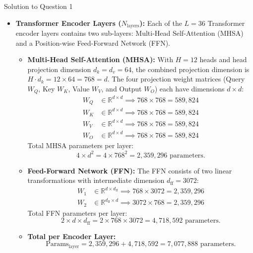 \documentclass[11pt,a4paper]{article}
\begin{document}
\begin{solutionbox}{Solution to Question 1}
\begin{itemize}[leftmargin=1.5cm]
    \item[\textbf{c)}] \textbf{Transformer Encoder Layers ($N_{\text{layers}}$):}
    Each of the $L = 36$ Transformer encoder layers contains two sub-layers: Multi-Head Self-Attention (MHSA) and a Position-wise Feed-Forward Network (FFN).
    
    \begin{itemize}
        \item \textbf{Multi-Head Self-Attention (MHSA):}
        With $H = 12$ heads and head projection dimension $d_k = d_v = 64$, the combined projection dimension is $H \cdot d_k = 12 \times 64 = 768 = d$.
        The four projection weight matrices (Query $W_Q$, Key $W_K$, Value $W_V$, and Output $W_O$) each have dimensions $d \times d$:
        \begin{align*}
        W_Q &\in \mathbb{R}^{d \times d} \implies 768 \times 768 = 589{,}824 \\
        W_K &\in \mathbb{R}^{d \times d} \implies 768 \times 768 = 589{,}824 \\
        W_V &\in \mathbb{R}^{d \times d} \implies 768 \times 768 = 589{,}824 \\
        W_O &\in \mathbb{R}^{d \times d} \implies 768 \times 768 = 589{,}824
        \end{align*}
        Total MHSA parameters per layer:
        \begin{equation*}
        4 \times d^2 = 4 \times 768^2 = 2{,}359{,}296 \text{ parameters}.
        \end{equation*}

        \item \textbf{Feed-Forward Network (FFN):}
        The FFN consists of two linear transformations with intermediate dimension $d_{\text{ff}} = 3072$:
        \begin{align*}
        W_1 &\in \mathbb{R}^{d \times d_{\text{ff}}} \implies 768 \times 3072 = 2{,}359{,}296 \\
        W_2 &\in \mathbb{R}^{d_{\text{ff}} \times d} \implies 3072 \times 768 = 2{,}359{,}296
        \end{align*}
        Total FFN parameters per layer:
        \begin{equation*}
        2 \times d \times d_{\text{ff}} = 2 \times 768 \times 3072 = 4{,}718{,}592 \text{ parameters}.
        \end{equation*}

        \item \textbf{Total per Encoder Layer:}
        \begin{equation*}
        \text{Params}_{\text{layer}} = 2{,}359{,}296 + 4{,}718{,}592 = 7{,}077{,}888 \text{ parameters}.
        \end{equation*}


\end{itemize}
\end{itemize}
\end{solutionbox}
\end{document}

